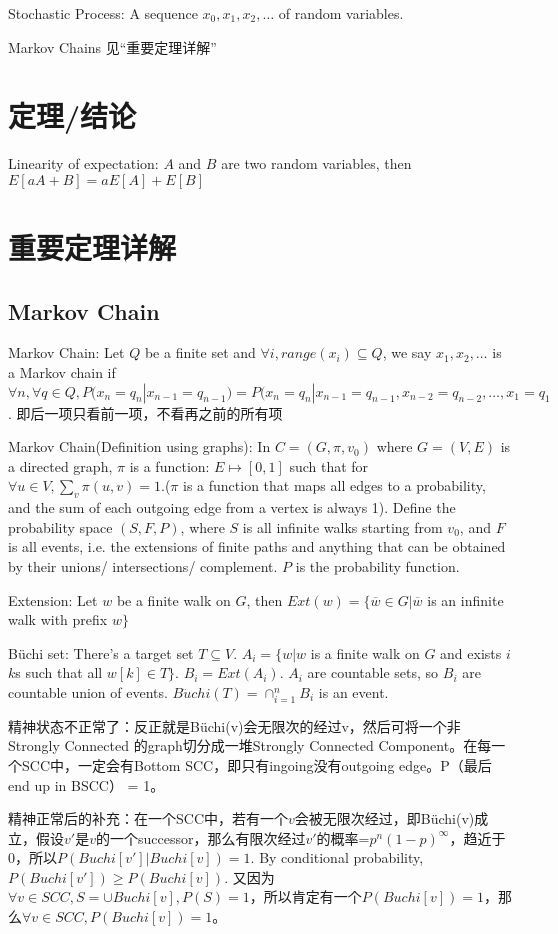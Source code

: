 \documentclass[12pt,a4paper]{ctexrep}
\begin{document}
Stochastic Process: A sequence $x_0,x_1,x_2,\dots$ of random variables.

Markov Chains 见“重要定理详解”
\section{定理/结论}
Linearity of expectation: $A$ and $B$ are two random variables, then $E[aA+B] = aE[A]+E[B]$
\section{重要定理详解}
\subsection{Markov Chain}
Markov Chain: Let $Q$ be a finite set and $\forall i, range(x_i) \subseteq Q$, we say $x_1,x_2,\dots$ is a Markov chain if $\forall n, \forall q \in Q, P(x_n = q_n|x_{n-1} = q_{n-1}) = P(x_n = q_n|x_{n-1} = q_{n-1},x_{n-2} = q_{n-2},\dots,x_{1} = q_{1}$. 即后一项只看前一项，不看再之前的所有项

Markov Chain(Definition using graphs): In $C = (G,\pi,v_0)$ where $G = (V,E)$ is a directed graph, $\pi$ is a function: $E\mapsto [0,1]$ such that for $\forall u \in V, \sum_{v} \pi(u,v) = 1$.($\pi$ is a function that maps all edges to a probability, and the sum of each outgoing edge from a vertex is always 1). Define the probability space $(S,F,P)$, where $S$ is all infinite walks starting from $v_0$, and $F$ is all events, i.e. the extensions of finite paths and anything that can be obtained by their unions/ intersections/ complement. $P$ is the probability function.

Extension: Let $w$ be a finite walk on $G$, then $Ext(w) = \{\overline{w} \in G| \overline{w}$ is an infinite walk with prefix $w\}$

B\"uchi set: There's a target set $T\subseteq V$. $A_i = \{w|w$ is a finite walk on $G$ and exists $i$ $k$s such that all $w[k] \in T\}$. $B_i = Ext(A_i)$. $A_i$ are countable sets, so $B_i$ are countable union of events. $B\ddot{u}chi(T) = \cap_{i=1}^n B_i$ is an event.

精神状态不正常了：反正就是B\"uchi(v)会无限次的经过v，然后可将一个非Strongly Connected 的graph切分成一堆Strongly Connected Component。在每一个SCC中，一定会有Bottom SCC，即只有ingoing没有outgoing edge。P（最后end up in BSCC） = 1。

精神正常后的补充：在一个SCC中，若有一个$v$会被无限次经过，即B\"uchi(v)成立，假设$v'$是$v$的一个successor，那么有限次经过$v'$的概率=$p^n(1-p)^{\infty}$，趋近于0，所以$P(Buchi[v']|Buchi[v])=1$. By conditional probability, $P(Buchi[v'])\geq P(Buchi[v])$. 又因为 $\forall v \in SCC, S=\cup Buchi[v], P(S)=1$，所以肯定有一个$P(Buchi[v])=1$，那么$\forall v \in SCC, P(Buchi[v])=1$。
\end{document}
